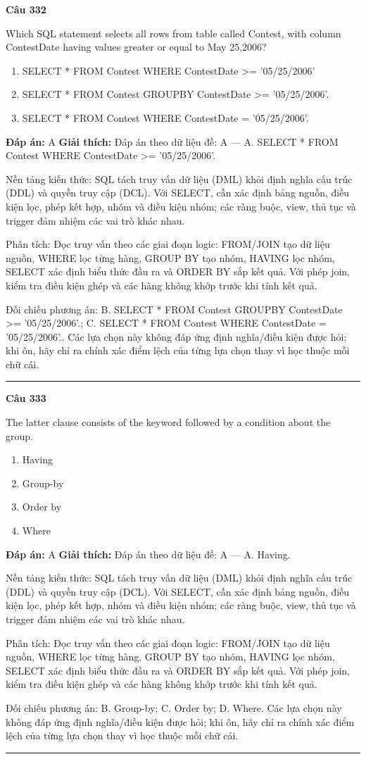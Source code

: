 \documentclass[11pt,a4paper]{article}
\newenvironment{question}[1]{%
  \par\vspace{1em}\noindent\textbf{\large Câu #1}\par\vspace{0.4em}
}{%
  \par\vspace{1em}\hrule\vspace{0.6em}
}
\newenvironment{choices}{%
  \begin{enumerate}[label=\textbf{\Alph*.},leftmargin=2.2em,itemsep=2pt,topsep=3pt]
}{%
  \end{enumerate}
}
\newcommand{\choice}{\item}
\begin{document}
\begin{question}{332}
Which SQL statement selects all rows from table called Contest, with column ContestDate having values greater or equal to May 25,2006?
\begin{choices}
\choice SELECT * FROM Contest WHERE ContestDate >= '05/25/2006'
\choice SELECT * FROM Contest GROUPBY ContestDate >= '05/25/2006'.
\choice SELECT * FROM Contest WHERE ContestDate = '05/25/2006'.
\end{choices}
\textbf{Đáp án:} A
\textbf{Giải thích:} Đáp án theo dữ liệu đề: A — A. SELECT * FROM Contest WHERE ContestDate >= '05/25/2006'.

Nền tảng kiến thức: SQL tách truy vấn dữ liệu (DML) khỏi định nghĩa cấu trúc (DDL) và quyền truy cập (DCL). Với SELECT, cần xác định bảng nguồn, điều kiện lọc, phép kết hợp, nhóm và điều kiện nhóm; các ràng buộc, view, thủ tục và trigger đảm nhiệm các vai trò khác nhau.

Phân tích: Đọc truy vấn theo các giai đoạn logic: FROM/JOIN tạo dữ liệu nguồn, WHERE lọc từng hàng, GROUP BY tạo nhóm, HAVING lọc nhóm, SELECT xác định biểu thức đầu ra và ORDER BY sắp kết quả. Với phép join, kiểm tra điều kiện ghép và các hàng không khớp trước khi tính kết quả.

Đối chiếu phương án: B. SELECT * FROM Contest GROUPBY ContestDate >= '05/25/2006'.; C. SELECT * FROM Contest WHERE ContestDate = '05/25/2006'.. Các lựa chọn này không đáp ứng định nghĩa/điều kiện được hỏi; khi ôn, hãy chỉ ra chính xác điểm lệch của từng lựa chọn thay vì học thuộc mỗi chữ cái.
\end{question}

\begin{question}{333}
The latter clause consists of the keyword followed by a condition about the group.
\begin{choices}
\choice Having
\choice Group-by
\choice Order by
\choice Where
\end{choices}
\textbf{Đáp án:} A
\textbf{Giải thích:} Đáp án theo dữ liệu đề: A — A. Having.

Nền tảng kiến thức: SQL tách truy vấn dữ liệu (DML) khỏi định nghĩa cấu trúc (DDL) và quyền truy cập (DCL). Với SELECT, cần xác định bảng nguồn, điều kiện lọc, phép kết hợp, nhóm và điều kiện nhóm; các ràng buộc, view, thủ tục và trigger đảm nhiệm các vai trò khác nhau.

Phân tích: Đọc truy vấn theo các giai đoạn logic: FROM/JOIN tạo dữ liệu nguồn, WHERE lọc từng hàng, GROUP BY tạo nhóm, HAVING lọc nhóm, SELECT xác định biểu thức đầu ra và ORDER BY sắp kết quả. Với phép join, kiểm tra điều kiện ghép và các hàng không khớp trước khi tính kết quả.

Đối chiếu phương án: B. Group-by; C. Order by; D. Where. Các lựa chọn này không đáp ứng định nghĩa/điều kiện được hỏi; khi ôn, hãy chỉ ra chính xác điểm lệch của từng lựa chọn thay vì học thuộc mỗi chữ cái.
\end{question}
\end{document}

